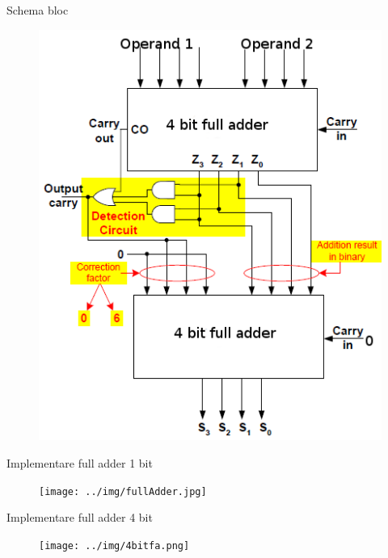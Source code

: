 \documentclass{beamer}
\begin{document}
\begin{frame}{Schema bloc}

\begin{figure}[H]
	\centering
	\includegraphics[scale=0.35]{../img/1digitBCDadder.png}
\end{figure}

\end{frame}

\begin{frame}{Implementare full adder 1 bit}

\begin{figure}[H]
	\centering
	\texttt{[image: ../img/fullAdder.jpg]}
\end{figure}

\end{frame}

\begin{frame}{Implementare full adder 4 bit}

\begin{figure}[H]
	\centering
	\texttt{[image: ../img/4bitfa.png]}
\end{figure}

\end{frame}
\end{document}
